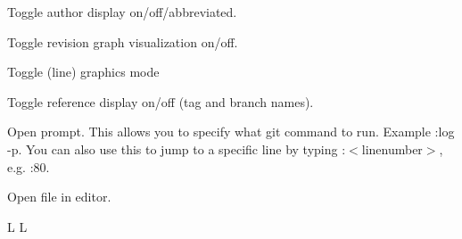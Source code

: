  {Toggle author display on/off/abbreviated.}

 {Toggle revision graph visualization on/off.}

\cmdS{~} {Toggle (line) graphics mode}

 {Toggle reference display on/off (tag and
             branch names).}

\cmdS{:} {Open prompt. This allows you to specify what
             git command to run. Example :log -p. You can
             also use this to jump to a specific line by
             typing :$<$linenumber$>$, e.g. :80.}

 {Open file in editor.}


\copyrightnotice

\supereject
\if L\lr \else\null\vfill\eject\fi
\if L\lr \else\null\vfill\eject\fi
\bye


